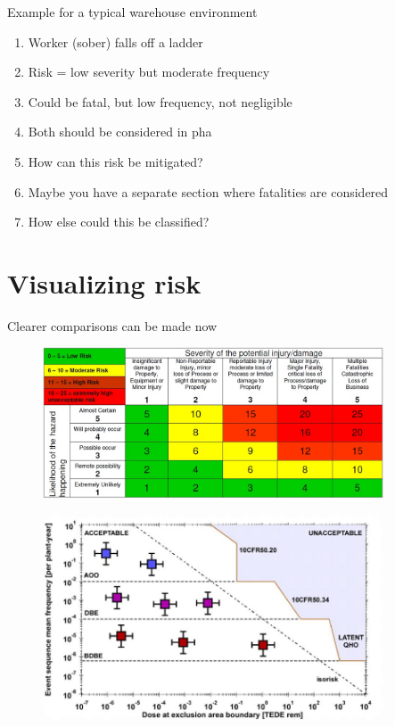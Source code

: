 \documentclass[aspectratio=1610,pdftex,dvipsnames,compress,xcolor={dvipsnames}]{beamer}
\newcommand{\acs}{\acrshort} %
\begin{document}
\begin{frame}{Example for a typical warehouse environment}
    \begin{enumerate}[series=outerlist,topsep=0pt,itemsep=21pt,leftmargin=*,label=(\arabic*)]
        \item[]Worker (sober) falls off a ladder
        \item[]Risk = low severity but moderate frequency
        \item[]Could be fatal, but low frequency, not negligible
        \item[]Both should be considered in \acs{pha}
        \item[]How can this risk be mitigated?
        \item[]Maybe you have a separate section where fatalities are considered
        \item[]How else could this be classified?
    \end{enumerate}
\end{frame}


\section{Visualizing risk}


\addtocounter{framenumber}{-1}
\begin{frame}{Clearer comparisons can be made now}
    \begin{figure}
        \centering
        \includegraphics[width=0.90\textwidth]{matrix.jpg}
    \end{figure}
\end{frame}


\begin{frame}{}
    \begin{figure}
        \centering
        \includegraphics[width=0.90\textwidth]{farmer.jpg}
    \end{figure}
\end{frame}
\end{document}
